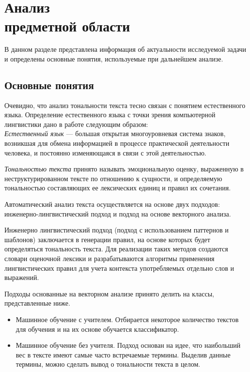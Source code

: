 \chapter[Анализ предметной области]{Анализ \\ предметной области}
В данном разделе представлена информация об актуальности исследуемой задачи и определены основные понятия, используемые при дальнейшем анализе.

\section{Основные понятия}
Очевидно, что анализ тональности текста тесно связан с понятием естественного языка. Определение естественного языка с точки зрения компьютерной лингвистики дано в работе \cite{ling-gen} следующим образом: \\
\textit{Естественный язык} --- большая открытая многоуровневая система знаков, возникшая для обмена информацией в процессе практической деятельности человека, и постоянно изменяющаяся в связи с этой деятельностью.

\textit{Тональностью текста} принято называть эмоциональную оценку, выраженную в неструктурированном тексте по отношению к сущности, и определяемую тональностью составляющих ее лексических единиц и правил их сочетания.

Автоматический анализ текста осуществляется на основе двух подходов: инженерно-лингвистический подход и подход на основе векторного анализа.

Инженерно лингвистический подход (подход с использованием паттернов и шаблонов) заключается в генерации правил, на основе которых будет определяться тональность текста. Для реализации таких методов создаются словари оценочной лексики и разрабатываются алгоритмы применения лингвистических правил для учета контекста употребляемых отдельно слов и выражений.

Подходы основанные на векторном анализе принято делить на классы, представленные ниже. 
\begin{itemize}
	\item Машинное обучение с учителем. Отбирается некоторое количество текстов для обучения и на их основе обучается классификатор. 
	\item Машинное обучение без учителя. Подход основан на идее, что наибольший вес в тексте имеют самые часто встречаемые термины.\cite{ml-uns} Выделив данные термины, можно сделать вывод о тональности текста в целом.
\end{itemize}


